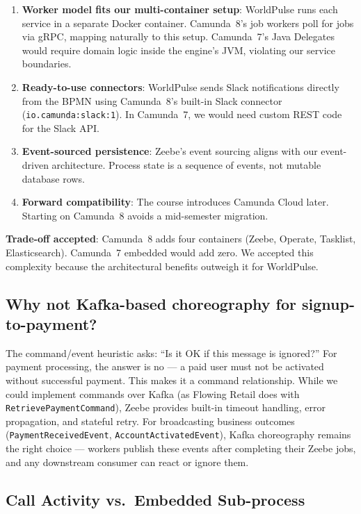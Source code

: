 \documentclass[10pt,a4paper]{article}
\begin{document}
\begin{enumerate}
    \item \textbf{Worker model fits our multi-container setup}: WorldPulse runs each service in a separate Docker container. Camunda~8's job workers poll for jobs via gRPC, mapping naturally to this setup. Camunda~7's Java Delegates would require domain logic inside the engine's JVM, violating our service boundaries.
    \item \textbf{Ready-to-use connectors}: WorldPulse sends Slack notifications directly from the BPMN using Camunda~8's built-in Slack connector (\texttt{io.camunda:slack:1}). In Camunda~7, we would need custom REST code for the Slack API.
    \item \textbf{Event-sourced persistence}: Zeebe's event sourcing aligns with our event-driven architecture. Process state is a sequence of events, not mutable database rows.
    \item \textbf{Forward compatibility}: The course introduces Camunda Cloud later. Starting on Camunda~8 avoids a mid-semester migration.
\end{enumerate}

\textbf{Trade-off accepted}: Camunda~8 adds four containers (Zeebe, Operate, Tasklist, Elasticsearch). Camunda~7 embedded would add zero. We accepted this complexity because the architectural benefits outweigh it for WorldPulse.

\subsection{Why not Kafka-based choreography for signup-to-payment?}

The command/event heuristic asks: ``Is it OK if this message is ignored?'' For payment processing, the answer is no --- a paid user must not be activated without successful payment. This makes it a command relationship. While we could implement commands over Kafka (as Flowing Retail does with \texttt{RetrievePaymentCommand}), Zeebe provides built-in timeout handling, error propagation, and stateful retry. For broadcasting business outcomes (\texttt{PaymentReceivedEvent}, \texttt{AccountActivatedEvent}), Kafka choreography remains the right choice --- workers publish these events after completing their Zeebe jobs, and any downstream consumer can react or ignore them.

\subsection{Call Activity vs.\ Embedded Sub-process}
\end{document}
